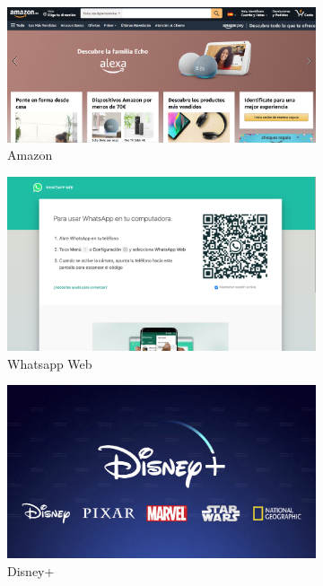 \begin{figure}[H]
\begin{subfigure}{.5\textwidth}
  \centering
  \includegraphics[width=.8\linewidth]{chapters/images/amazon.png}
  \caption{Amazon}
  \label{fig:sub-first}
\end{subfigure}
\begin{subfigure}{.5\textwidth}
  \centering
  \includegraphics[width=.8\linewidth]{chapters/images/whatsappweb.png}  
  \caption{Whatsapp Web}
  \label{fig:sub-second}
\end{subfigure}
\begin{subfigure}{.5\textwidth}
  \centering
  \includegraphics[width=.8\linewidth]{chapters/images/disney.jpeg}  
  \caption{Disney+}
  \label{fig:sub-third}
\end{subfigure}
\begin{subfigure}{.5\textwidth}

\end{subfigure}
\end{figure}
